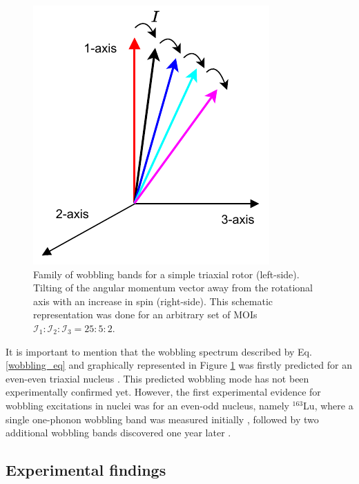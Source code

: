 \documentclass[11pt]{article}
\begin{document}
\begin{figure}
\begin{minipage}{.4\textwidth}
 \includegraphics[width=0.8\linewidth]{figs/wobbling_tilting_axis.pdf}
\end{minipage}
\label{simple-wobbling-family}
\caption{Family of wobbling bands for a simple triaxial rotor (left-side). Tilting of the angular momentum vector away from the rotational axis with an increase in spin (right-side). This schematic representation was done for an arbitrary set of MOIs $\mathcal{I}_1:\mathcal{I}_2:\mathcal{I}_3=25:5:2$.}
\end{figure}

It is important to mention that the wobbling spectrum described by Eq. \ref{wobbling_eq} and graphically represented in Figure \ref{simple-wobbling-family} was firstly predicted for an even-even triaxial nucleus \cite{bohr1998nuclear}. This predicted wobbling mode has not been experimentally confirmed yet. However, the first experimental evidence for wobbling excitations in nuclei was for an even-odd nucleus, namely $^{163}$Lu, where a single one-phonon wobbling band was measured initially \cite{odegaard2001evidence}, followed by two additional wobbling bands discovered one year later \cite{jensen2002evidence,jensen2002wobbling}.

\subsection{Experimental findings}
\end{document}

